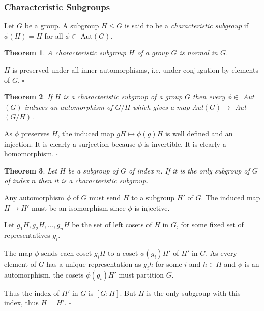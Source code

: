 \documentclass[10pt]{article}
\newtheorem{theorem}{Theorem}[section]
\newenvironment{proof}[1][Proof]{\begin{trivlist}
\item[\hskip \labelsep {\itshape #1}]}{\end{trivlist}}
\newenvironment{definition}[1][Definition]{\begin{trivlist}
\item[\hskip \labelsep {\bfseries #1}]}{\end{trivlist}}
\begin{document}
\subsubsection{Characteristic Subgroups}

\begin{definition}
Let $G$ be a group. A subgroup $H \leq G$ is said to be a \emph{characteristic subgroup} if $\phi(H) = H$ for all $\phi \in$ Aut$(G)$.
\end{definition}

\begin{theorem}
A characteristic subgroup $H$ of a group $G$ is normal in $G$.
\end{theorem}

\begin{proof}
$H$ is preserved under all inner automorphisms, i.e. under conjugation by elements of $G$. $\square$
\end{proof}

\begin{theorem}
If $H$ is a characteristic subgroup of a group $G$ then every $\phi \in$ Aut$(G)$ induces an automorphism of $G/H$ which gives a map Aut$(G) \to$ Aut$(G/H)$.
\end{theorem}

\begin{proof}
As $\phi$ preserves $H$, the induced map $gH \mapsto \phi(g)H$ is well defined and an injection. It is clearly a surjection because $\phi$ is invertible. It is clearly a homomorphism. $\square$
\end{proof}

\begin{theorem}
Let $H$ be a subgroup of $G$ of index $n$. If it is the only subgroup of $G$ of index $n$ then it is a characteristic subgroup.
\end{theorem}

\begin{proof}
Any automorphism $\phi$ of $G$ must send $H$ to a subgroup $H'$ of $G$. The induced map $H \to H'$ must be an isomorphism since $\phi$ is injective.

Let $g_1H, g_2H, \ldots, g_nH$ be the set of left cosets of $H$ in $G$, for some fixed set of representatives $g_i$.

The map $\phi$ sends each coset $g_iH$ to a coset $\phi(g_i)H'$ of $H'$ in $G$. As every element of $G$ has a unique representation as $g_ih$ for some $i$ and $h \in H$ and $\phi$ is an automorphism, the cosets $\phi(g_i)H'$ must partition $G$.

Thus the index of $H'$ in $G$ is $[G:H]$. But $H$ is the only subgroup with this index, thus $H = H'$. $\square$
\end{proof}
\end{document}

